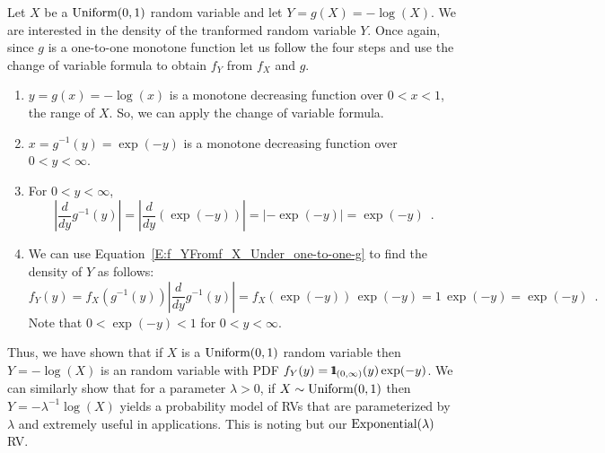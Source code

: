 \begin{example}\label{Eg:Expontial1IsMinusLogOfUniform01}
Let $X$ be a $\mbox{{\rm Uniform}}(0,1)$ random variable and let $Y=g(X)=-\log(X)$.  
We are interested in the density of the tranformed random variable $Y$.  
Once again, since $g$ is a one-to-one monotone function let us follow the four steps and use the change of variable formula to obtain $f_Y$ from $f_X$ and $g$.
\begin{enumerate}
\item $y=g(x)=-\log(x)$ is a monotone decreasing function over $0 < x < 1$, the range of $X$.  
So, we can apply the change of variable formula. 
\item $x=g^{-1}(y)=\exp(-y)$ is a monotone decreasing function over %
$0 < y < \infty$.  
\item For $0 < y < \infty$,
\[
 \left\vert \frac{d}{dy} g^{-1}(y) \right\vert 
= \left\vert \frac{d}{dy} \left( \exp(-y) \right) \right\vert 
= \left\vert -\exp(-y) \right\vert = \exp(-y) \enspace .
\]
\item We can use Equation~\eqref{E:f_YFromf_X_Under_one-to-one-g} to find the density of $Y$ as follows:
\[
f_Y(y) = f_X \left( g^{-1}(y) \right) \left\vert \frac{d}{dy} g^{-1}(y) \right\vert 
= f_X \left( \exp(-y) \right)  \, \exp(-y)
= 1 \, \exp(-y) = \exp(-y) \enspace .
\]
Note that $0 < \exp(-y) < 1$ for $0 < y < \infty$.
\end{enumerate}
Thus, we have shown that if $X$ is a $\mbox{{\rm Uniform}}(0,1)$ random variable then $Y=-\log(X)$ is an random variable with PDF $f_Y(y)={1}\mspace{-11 mu}{1}_{(0,\infty)}(y)\exp(-y)$. 
We can similarly show that for a parameter $\lambda>0$, if $X \sim \mbox{{\rm Uniform}}(0,1)$ then $Y=-\lambda^{-1} \log(X)$ yields a probability model of RVs that are parameterized by $\lambda$ and extremely useful in applications. This is noting but our $\mbox{{\rm Exponential}}(\lambda)$ RV.
\end{example}


